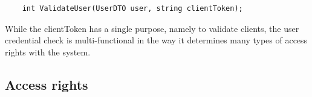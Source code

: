 \documentclass[../report.tex]{subfiles}
\begin{document}
\begin{center}
\begin{lstlisting}
	int ValidateUser(UserDTO user, string clientToken);
\end{lstlisting}
\end{center}


While the clientToken has a single purpose, namely to validate clients, the user credential check is multi-functional in the way it determines many types of access rights with the system.


\subsection{Access rights}

\end{document}
